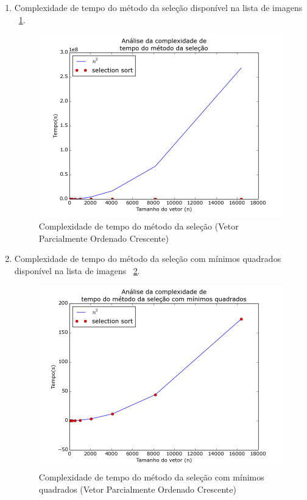 \documentclass[12pt,a4paper,twoside]{report}
\begin{document}
\begin{enumerate}
\begin{enumerate}
								\item Complexidade de tempo do método da seleção disponível na lista de imagens ~\ref{fig:SelectionPlot2POC}.
								\begin{figure}[!h]
									\centering
									\includegraphics[scale=0.6]{../imagens/Selection/selection_plot_2_parcialmente_ordenado_crescente.png}
									\caption{Complexidade de tempo do método da seleção (Vetor Parcialmente Ordenado Crescente) \label{fig:SelectionPlot2POC}}
								\end{figure}


								\item Complexidade de tempo do método da seleção com mínimos quadrados disponível na lista de imagens  ~\ref{fig:SelectionPlot3POC}.
								\begin{figure}[!h]
									\centering
									\includegraphics[scale=0.6]{../imagens/Selection/selection_plot_3_parcialmente_ordenado_crescente.png}
									\caption{Complexidade de tempo do método da seleção com mínimos quadrados (Vetor Parcialmente Ordenado Crescente) \label{fig:SelectionPlot3POC}}
								\end{figure}


\end{enumerate}
\end{enumerate}
\end{document}
